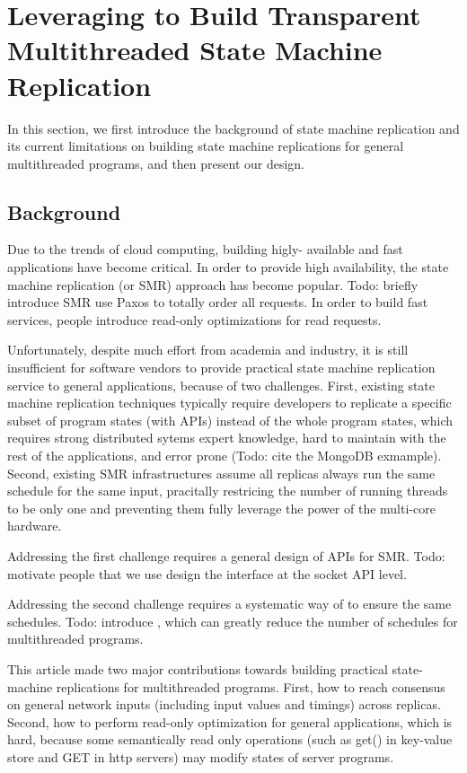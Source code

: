 \section{Leveraging \smt to Build Transparent Multithreaded State Machine Replication} \label{sec:replication}

In this section, we first introduce the background of state machine replication 
and its current limitations on building state machine replications for general 
multithreaded programs, and then present our design.

\subsection{Background} \label{sec:rep-intro}

Due to the trends of cloud computing, building higly-
available and fast applications have become critical. In order to 
provide high availability, the state machine replication (or SMR) approach has become 
popular. Todo: briefly introduce SMR use Paxos to totally order all requests. In order to
build fast services, people introduce read-only optimizations for read requests.

Unfortunately, despite much effort from academia and industry, it is still 
insufficient for software vendors to provide practical state machine 
replication service to general applications, because of two challenges. First, existing 
state machine replication techniques typically require developers to replicate 
a specific subset of program states (with APIs) instead of the whole program 
states, which requires strong distributed sytems expert knowledge, hard to 
maintain with the rest of the applications, and error prone 
(Todo: cite the MongoDB exmample). Second, existing SMR infrastructures assume all 
replicas always run the same schedule for the same input, pracitally restricing 
the number of running threads to be only one and preventing them fully leverage the 
power of the multi-core hardware.

Addressing the first challenge requires a general design of APIs for SMR. 
Todo: motivate people that we use design the interface at the socket API level.

Addressing the second challenge requires a systematic way of to ensure the same 
schedules. Todo: introduce \smt, which can greatly reduce the number of schedules for 
multithreaded programs.

This article made two major contributions towards building practical state-
machine replications for multithreaded programs. First, how to reach 
consensus on general network inputs (including input values and timings) 
across replicas. Second, how to perform read-only 
optimization for general applications, which is hard, because some 
semantically read only operations (such as get() in key-value store and GET 
in http servers) may modify states of server programs.

